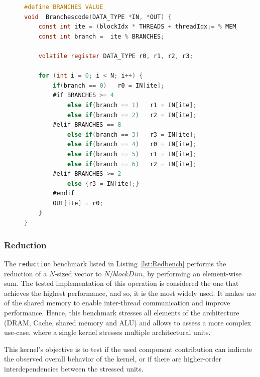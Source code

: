 \begin{figure}[h]
\begin{lstlisting}[language=C, caption=Branches Benchmark Code, label=lst:Branchesbench, basicstyle=\footnotesize\ttfamily,abovecaptionskip=0pt, captionpos=b]
#define BRANCHES VALUE
void  Branchescode(DATA_TYPE *IN, *OUT) {
    const int ite = (blockIdx * THREADS + threadIdx;= % MEM_BLOCK;
    const int branch =  ite % BRANCHES;
    
    volatile register DATA_TYPE r0, r1, r2, r3;
    
    for (int i = 0; i < N; i++) {
        if(branch == 0)   r0 = IN[ite];
        #if BRANCHES >= 4
            else if(branch == 1)   r1 = IN[ite];
            else if(branch == 2)   r2 = IN[ite];
        #elif BRANCHES == 8
            else if(branch == 3)   r3 = IN[ite];
            else if(branch == 4)   r0 = IN[ite];
            else if(branch == 5)   r1 = IN[ite];
            else if(branch == 6)   r2 = IN[ite];
        #elif BRANCHES >= 2
            else {r3 = IN[ite];}
        #endif
        OUT[ite] = r0;
    }
}
\end{lstlisting}
\end{figure}

\subsubsection{Reduction}

The \texttt{reduction} benchmark listed in Listing~\ref{lst:Redbench} performs the reduction of a $N$-sized vector to $N/blockDim$, by performing an element-wise sum. The tested implementation of this operation is considered the one that achieves the highest performance, and so, it is the most widely used. It makes use of the shared memory to enable inter-thread communication and improve performance. Hence, this benchmark stresses all elements of the architecture (DRAM, Cache, shared memory and ALU) and allows to assess a more complex use-case, where a single kernel stresses multiple architectural units.

This kernel's objective is to test if the used component contribution can indicate the observed overall behavior of the kernel, or if there are higher-order interdependencies between the stressed units.

